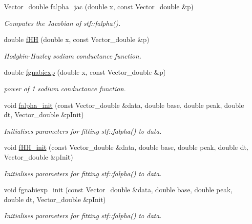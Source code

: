\begin{DoxyCompactItemize}
Vector\_\-double \hyperlink{group__stfgen_ga8b22dedbea54a0994d9b41d5c03d0459}{falpha\_\-jac} (double x, const Vector\_\-double \&p)
\begin{DoxyCompactList}\small\item\em Computes the Jacobian of stf::falpha(). \item\end{DoxyCompactList}\item 
double \hyperlink{group__stfgen_ga63447f9728c486a97b390102ff325018}{fHH} (double x, const Vector\_\-double \&p)
\begin{DoxyCompactList}\small\item\em Hodgkin-\/Huxley sodium conductance function. \item\end{DoxyCompactList}\item 
double \hyperlink{group__stfgen_ga6c64c923dcb8f39d644163ab0c09abbe}{fgnabiexp} (double x, const Vector\_\-double \&p)
\begin{DoxyCompactList}\small\item\em power of 1 sodium conductance function. \item\end{DoxyCompactList}\item 
void \hyperlink{group__stfgen_ga47d38cf93cda965b8dc517cf5fa20ac1}{falpha\_\-init} (const Vector\_\-double \&data, double base, double peak, double dt, Vector\_\-double \&pInit)
\begin{DoxyCompactList}\small\item\em Initialises parameters for fitting stf::falpha() to {\itshape data\/}. \item\end{DoxyCompactList}\item 
void \hyperlink{group__stfgen_gacaee0bf94446342456475acd827bb1f1}{fHH\_\-init} (const Vector\_\-double \&data, double base, double peak, double dt, Vector\_\-double \&pInit)
\begin{DoxyCompactList}\small\item\em Initialises parameters for fitting stf::falpha() to {\itshape data\/}. \item\end{DoxyCompactList}\item 
void \hyperlink{group__stfgen_ga5454dcb2feefac399c4f5e9d7a277dd7}{fgnabiexp\_\-init} (const Vector\_\-double \&data, double base, double peak, double dt, Vector\_\-double \&pInit)
\begin{DoxyCompactList}\small\item\em Initialises parameters for fitting stf::falpha() to {\itshape data\/}. \item\end{DoxyCompactList}\item 

\end{DoxyCompactItemize}
